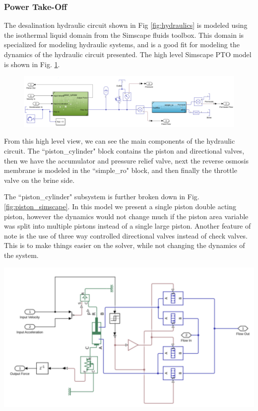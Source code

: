 \documentclass[twocolumn,10pt]{asme2e}
\begin{document}
\subsubsection{Power Take-Off}

The desalination hydraulic circuit shown in Fig \ref{fig:hydraulics} is modeled using the isothermal liquid domain from the Simscape fluids toolbox. This domain is specialized for modeling hydraulic systems, and is a good fit for modeling the dynamics of the hydraulic circuit presented. The high level Simscape PTO model is shown in Fig. \ref{fig:hydraulic_simscape}.

\begin{figure}[t]  %
    \centering
    \includegraphics[width=\linewidth]{../figs/hydraulic_simscape.pdf}
    \label{fig:hydraulic_simscape}
\end{figure}

From this high level view, we can see the main components of the hydraulic circuit. The ``piston\_cylinder" block contains the piston and directional valves, then we have the accumulator and pressure relief valve, next the reverse osmosis membrane is modeled in the ``simple\_ro" block, and then finally the throttle valve on the brine side.

The ``piston\_cylinder" subsystem is further broken down in Fig. \ref{fig:piston_simscape}. In this model we present a single piston double acting piston, however the dynamics would not change much if the piston area variable was split into multiple pistons instead of a single large piston. Another feature of note is the use of three way controlled directional valves instead of check valves. This is to make things easier on the solver, while not changing the dynamics of the system.

\begin{center}
    \includegraphics[width=\linewidth]{../figs/pistonsimscape.pdf}
    \label{fig:piston_simscape}
\end{center}
\end{document}
